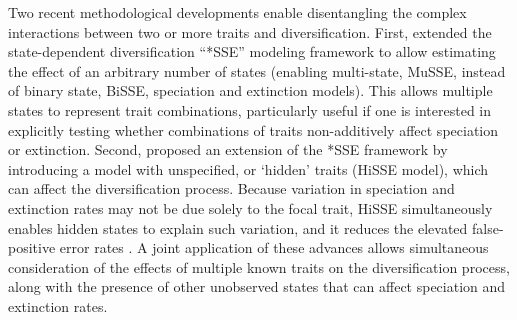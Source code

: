 Two recent methodological developments enable disentangling the complex interactions between two or more traits and diversification.
First, \citet{fitzjohn_2012} extended the state-dependent diversification ``*SSE'' modeling framework \citep{maddison_2007} to allow estimating the effect of an arbitrary number of states (enabling multi-state, MuSSE, instead of binary state, BiSSE, speciation and extinction models).
This allows multiple states to represent trait combinations, particularly useful if one is interested in explicitly testing whether combinations of traits non-additively affect speciation or extinction. 
Second, \citet{beaulieu_2016}  proposed an extension of the *SSE framework by introducing a model with unspecified, or `hidden' traits (HiSSE model), which can affect the diversification process.
Because variation in speciation and extinction rates may not be due solely to the focal trait, HiSSE simultaneously enables hidden states to explain such variation, and it reduces the elevated false-positive error rates \citep{rabosky_2017}.
A joint application of these advances allows simultaneous consideration of the effects of multiple known traits on the diversification process, along with the presence of other unobserved states that can affect speciation and extinction rates. 


